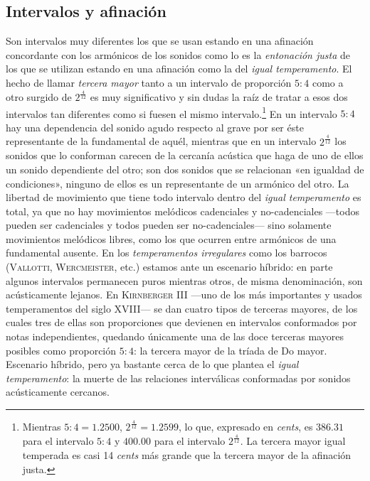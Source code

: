 \documentclass[a4paper,10pt]{article}
\begin{document}
\begin{multicols}{2}
  \section{Intervalos y afinación}\label{sec:intervalos-afinacion}
  Son intervalos muy diferentes los que se usan estando en una afinación concordante con los armónicos de los sonidos como lo es la \emph{entonación justa} de los que se utilizan estando en una afinación como la del \emph{igual temperamento}. El hecho de llamar \emph{tercera mayor} tanto a un intervalo de proporción $5:4$ como a otro surgido de $2^{\frac{4}{12}}$ es muy significativo y sin dudas la raíz de tratar a esos dos intervalos tan diferentes como si fuesen el mismo intervalo.\footnote{Mientras $5:4=1.2500$, $2^{\frac{4}{12}}=1.2599$, lo que, expresado en \emph{cents}, es $386.31$ para el intervalo $5:4$ y $400.00$ para el intervalo $2^{\frac{4}{12}}$. La tercera mayor igual temperada es casi 14 \emph{cents} más grande que la tercera mayor de la afinación justa.} En un intervalo $5:4$ hay una dependencia del sonido agudo respecto al grave por ser éste representante de la fundamental de aquél, mientras que en un intervalo $2^{\frac{4}{12}}$ los sonidos que lo conforman carecen de la cercanía acústica que haga de uno de ellos un sonido dependiente del otro; son dos sonidos que se relacionan «en igualdad de condiciones», ninguno de ellos es un representante de un armónico del otro. La libertad de movimiento que tiene todo intervalo dentro del \emph{igual temperamento} es total, ya que no hay movimientos melódicos cadenciales y no-cadenciales ---todos pueden ser cadenciales y todos pueden ser no-cadenciales--- sino solamente movimientos melódicos libres, como los que ocurren entre armónicos de una fundamental ausente. En los \emph{temperamentos irregulares} como los barrocos (\textsc{Vallotti}, \textsc{Wercmeister}, etc.) estamos ante un escenario híbrido: en parte algunos intervalos permanecen puros mientras otros, de misma denominación, son acústicamente lejanos. En \textsc{Kirnberger III} ---uno de los más importantes y usados temperamentos del siglo XVIII--- se dan cuatro tipos de terceras mayores, de los cuales tres de ellas son proporciones que devienen en intervalos conformados por notas independientes, quedando únicamente una de las doce terceras mayores posibles como proporción $5:4$: la tercera mayor de la tríada de Do mayor. Escenario híbrido, pero ya bastante cerca de lo que plantea el \emph{igual temperamento}: la muerte de las relaciones interválicas conformadas por sonidos acústicamente cercanos.
\end{multicols}
\end{document}
